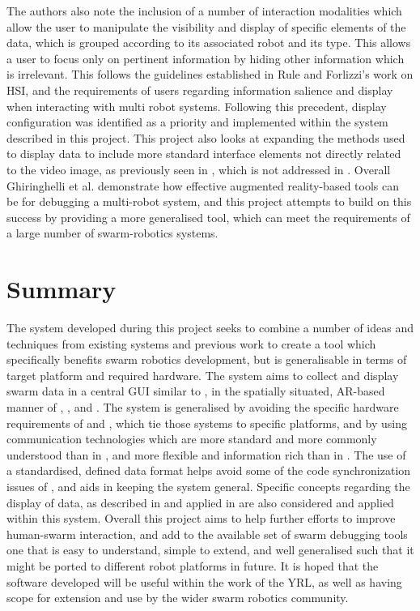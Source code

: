 The authors \cite{Ghiringhelli:2014} also note the inclusion of a number of interaction modalities which allow the user to manipulate the visibility and display of specific elements of the data, which is grouped according to its associated robot and its type. This allows a user to focus only on pertinent information by hiding other information which is irrelevant. This follows the guidelines established in Rule and Forlizzi's work \cite{Rule:2012} on HSI, and the requirements of users regarding information salience and display when interacting with multi robot systems. Following this precedent, display configuration was identified as a priority and implemented within the system described in this project. This project also looks at expanding the methods used to display data to include more standard interface elements not directly related to the video image, as previously seen in \cite{McLurkin:2006}, which is not addressed in \cite{Ghiringhelli:2014}. Overall Ghiringhelli et al. \cite{Ghiringhelli:2014} demonstrate how effective augmented reality-based tools can be for debugging a multi-robot system, and this project attempts to build on this success by providing a more generalised tool, which can meet the requirements of a large number of swarm-robotics systems.

\section{Summary}
The system developed during this project seeks to combine a number of ideas and techniques from existing systems and previous work to create a tool which specifically benefits swarm robotics development, but is generalisable in terms of target platform and required hardware. The system aims to collect and display swarm data in a central GUI similar to \cite{McLurkin:2006}, in the spatially situated, AR-based manner of \cite{Collet:2006}, \cite{Daily:2003}, and \cite{Ghiringhelli:2014}. The system is generalised by avoiding the specific hardware requirements of \cite{McLurkin:2006} and \cite{Collet:2006}, which tie those systems to specific platforms, and by using communication technologies which are more standard and more commonly understood than in \cite{Daily:2003}, and more flexible and information rich than in \cite{Podevijn:2012}. The use of a standardised, defined data format helps avoid some of the code synchronization issues of \cite{McLurkin:2006}, and aids in keeping the system general. Specific concepts regarding the display of data, as described in \cite{Rule:2012} and applied in \cite{Ghiringhelli:2014} are also considered and applied within this system. Overall this project aims to help further efforts to improve human-swarm interaction, and add to the available set of swarm debugging tools one that is easy to understand, simple to extend, and well generalised such that it might be ported to different robot platforms in future. It is hoped that the software developed will be useful within the work of the YRL, as well as having scope for extension and use by the wider swarm robotics community.

